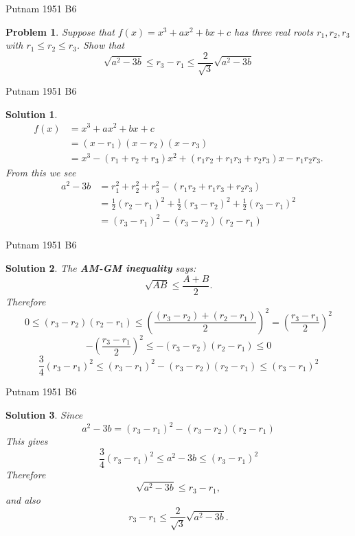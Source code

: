 \documentclass{beamer}
\newtheorem{prob}{Problem}
\newtheorem{soln}{Solution}
\begin{document}
\begin{frame}{Putnam 1951 B6}
\begin{prob}
Suppose that $f(x) = x^3 + ax^2 + bx + c$ has three real roots $r_1,r_2,r_3$ with $r_1 \leq r_2 \leq r_3$.
Show that
$$\sqrt{a^2-3b}\leq r_3-r_1\leq \frac{2}{\sqrt{3}}\sqrt{a^2-3b}$$

\end{prob}
\end{frame}

\begin{frame}{Putnam 1951 B6}
\begin{soln}
\pause
\begin{align*}
f(x)
 & = x^3+ax^2+bx+c\\
 & = (x-r_1)(x-r_2)(x-r_3)\\
 & = x^3 - (r_1+r_2+r_3)x^2 + (r_1r_2 + r_1r_3 + r_2r_3)x - r_1r_2r_3.
\end{align*}
\pause
From this we see
\begin{align*}
a^2-3b
  & = r_1^2+r_2^2+r_3^2-(r_1r_2+r_1r_3+r_2r_3)\\
  & = \frac{1}{2}(r_2-r_1)^2+ \frac{1}{2}(r_3-r_2)^2+ \frac{1}{2}(r_3-r_1)^2\\
  & = (r_3-r_1)^2 -(r_3-r_2)(r_2-r_1)
\end{align*}
\end{soln}
\end{frame}

\begin{frame}{Putnam 1951 B6}
\begin{soln}
The \textbf{AM-GM inequality} says:
$$\sqrt{AB}\leq \frac{A+B}{2}.$$
\pause
Therefore
$$0\leq (r_3-r_2)(r_2-r_1) \leq \left(\frac{(r_3-r_2) + (r_2-r_1)}{2}\right)^2 = \left(\frac{r_3-r_1}{2}\right)^2$$
\pause
$$-\left(\frac{r_3-r_1}{2}\right)^2\leq -(r_3-r_2)(r_2-r_1) \leq 0$$
\pause
$$\frac{3}{4}(r_3-r_1)^2 \leq (r_3-r_1)^2-(r_3-r_2)(r_2-r_1) \leq (r_3-r_1)^2 $$
\end{soln}
\end{frame}

\begin{frame}{Putnam 1951 B6}
\begin{soln}
Since 
$$a^2-3b  = (r_3-r_1)^2 -(r_3-r_2)(r_2-r_1)$$
\pause
This gives
$$\frac{3}{4}(r_3-r_1)^2 \leq a^2-3b \leq (r_3-r_1)^2 $$
\pause
Therefore
$$\sqrt{a^2-3b} \leq r_3-r_1,$$
\pause
and also
$$r_3-r_1 \leq \frac{2}{\sqrt{3}}\sqrt{a^2-3b}.$$
\end{soln}
\end{frame}
\end{document}
